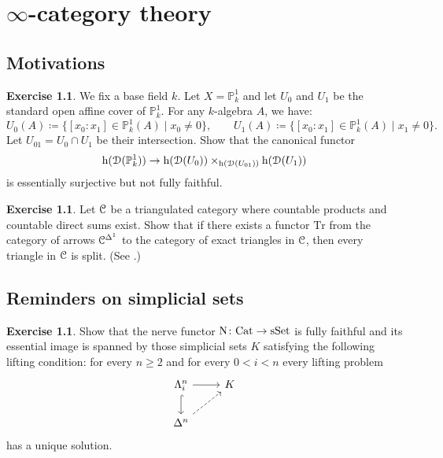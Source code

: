 \documentclass[10pt,a4paper,reqno,oneside]{book} %
\theoremstyle{plain}
\theoremstyle{definition}
\newtheorem{exercise}[thm]{Exercise}
\theoremstyle{remark}
\numberwithin{equation}{section}
\begin{document}
\chapter{$\infty$-category theory}

\section{Motivations}

\begin{exercise}
	We fix a base field $k$.
	Let $X = \mathbb P^1_k$ and let $U_0$ and $U_1$ be the standard open affine cover of $\mathbb P^1_k$.
	For any $k$-algebra $A$, we have:
	\[ U_0(A) \coloneqq \{ [x_0:x_1] \in \mathbb P^1_k(A) \mid x_0 \ne 0\},  \qquad U_1(A) \coloneqq \{[x_0:x_1] \in \mathbb P^1_k(A) \mid x_1 \ne 0\} . \]
	Let $U_{01} = U_0 \cap U_1$ be their intersection.
	Show that the canonical functor
	\[ \mathrm h( \mathcal D(\mathbb P^1_k) ) \to \mathrm h( \mathcal D( U_0 ) ) \times_{\mathrm h( \mathcal D( U_{01} ) )} \mathrm h( \mathcal D( U_1 ) )  \]
	is essentially surjective but not fully faithful.
\end{exercise}

\begin{exercise}
	Let $\mathcal C$ be a triangulated category where countable products and countable direct sums exist.
	Show that if there exists a functor $\mathrm{Tr}$ from the category of arrows $\mathcal C^{\Delta^1}$ to the category of exact triangles in $\mathcal C$, then every triangle in $\mathcal C$ is split.
	(See \cite[Proposition II.1.2.13]{Verdier_Triangulated_categories}.)
\end{exercise}

\section{Reminders on simplicial sets}

\begin{exercise}
	Show that the nerve functor $\mathrm N \colon \mathrm{Cat} \to \mathrm{sSet}$ is fully faithful and its essential image is spanned by those simplicial sets $K$ satisfying the following lifting condition: for every $n \ge 2$ and for every $0 < i < n$ every lifting problem
	\[ \begin{tikzcd}
		\Lambda^n_i \arrow{r} \arrow[hook]{d} & K \\
		\Delta^n \arrow[dashed]{ur}
	\end{tikzcd} \]
	has a unique solution.
\end{exercise}
\end{document}
